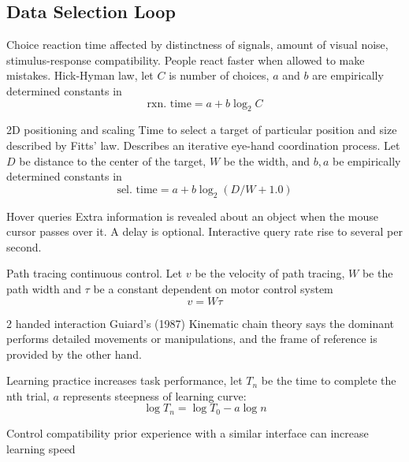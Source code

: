 \begin{mdframed}\begin{multicols}{2}
\subsection{Data Selection Loop}
\begin{compactdesc}
\item[Choice reaction time] affected by distinctness of signals, amount of
    visual noise, stimulus-response compatibility. People react faster when
    allowed  to make mistakes. Hick-Hyman law, let $C$ is number of choices,
    $a$ and $b$ are empirically determined constants in
    \[
        \text{rxn. time} = a + b\log_2C
    \]
\item[2D positioning and scaling] Time to select a target of particular
    position and size described by Fitts' law. Describes an iterative
    eye-hand coordination process. Let $D$ be distance to the center of the
    target, $W$ be the width, and $b, a$  be empirically determined constants
    in
    \[
        \text{sel. time} = a + b\log_2 (D/W + 1.0)
    \]

\item[Hover queries]
    Extra information is revealed about an object when the mouse cursor
    passes over it. A delay is optional. Interactive query rate rise to several
    per second.
\item[Path tracing] continuous control. Let $v$ be the velocity of path
    tracing, $W$ be the path width and $\tau$ be a constant dependent on motor
    control system
    \[
        v = W\tau
    \]
\item[2 handed interaction] Guiard's (1987) Kinematic chain theory says the
    dominant performs detailed movements or manipulations, and the frame of
    reference is provided by the other hand.
\item[Learning] practice increases task performance, let $T_n$ be the
    time to complete the nth trial, $a$ represents steepness of learning
    curve:
    \[
        \log T_n = \log T_0 - a\log n
    \]
\item[Control compatibility] prior experience with a similar interface can
    increase learning speed
\end{compactdesc}
\end{multicols}\end{mdframed}




